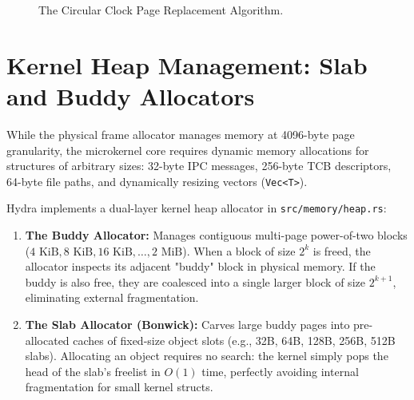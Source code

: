 \begin{figure}[htbp]
\centering
{}
\caption{The Circular Clock Page Replacement Algorithm.}
\label{fig:clock_algorithm}
\end{figure}

\section{Kernel Heap Management: Slab and Buddy Allocators}
\label{sec:kernel_heap}

While the physical frame allocator manages memory at 4096-byte page granularity, the microkernel core requires dynamic memory allocations for structures of arbitrary sizes: 32-byte IPC messages, 256-byte TCB descriptors, 64-byte file paths, and dynamically resizing vectors (\texttt{Vec<T>}).

Hydra implements a dual-layer kernel heap allocator in \texttt{src/memory/heap.rs}:
\begin{enumerate}
    \item \textbf{The Buddy Allocator:} Manages contiguous multi-page power-of-two blocks ($4\text{ KiB}, 8\text{ KiB}, 16\text{ KiB}, \dots, 2\text{ MiB}$). When a block of size $2^k$ is freed, the allocator inspects its adjacent "buddy" block in physical memory. If the buddy is also free, they are coalesced into a single larger block of size $2^{k+1}$, eliminating external fragmentation.
    \item \textbf{The Slab Allocator (Bonwick):} Carves large buddy pages into pre-allocated caches of fixed-size object slots (e.g., 32B, 64B, 128B, 256B, 512B slabs). Allocating an object requires no search: the kernel simply pops the head of the slab's freelist in $O(1)$ time, perfectly avoiding internal fragmentation for small kernel structs.
\end{enumerate}

